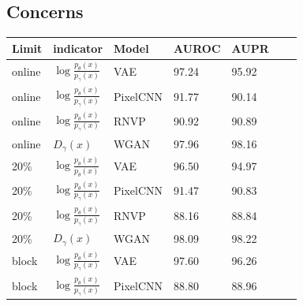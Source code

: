 \documentclass[letterpaper]{article} %
\begin{document}
\subsection{Concerns}
\begin{table}[htbp]
\centering
\begin{tabular}{lllllll}
Limit & indicator  & Model & AUROC & AUPR  \\
\toprule
online & $\log \frac{p_\theta(x)}{p_\gamma(x)}$ & VAE & 97.24 & 95.92 \\
online & $\log \frac{p_\theta(x)}{p_\gamma(x)}$ & PixelCNN & 91.77 & 90.14 \\
online & $\log \frac{p_\theta(x)}{p_\gamma(x)}$ & RNVP & 90.92 & 90.89 \\
online & $D_\gamma(x)$ & WGAN & 97.96 & 98.16 \\
20\% & $\log \frac{p_\theta(x)}{p_\theta(x)}$ & VAE & 96.50 & 94.97 \\
20\% & $\log \frac{p_\theta(x)}{p_\gamma(x)}$ & PixelCNN & 91.47 & 90.83 \\
20\% & $\log \frac{p_\theta(x)}{p_\gamma(x)}$ & RNVP & 88.16 & 88.84 \\
20\% & $D_\gamma(x)$ & WGAN & 98.09 & 98.22 \\
block & $\log \frac{p_\theta(x)}{p_\gamma(x)}$ & VAE & 97.60 & 96.26 \\
block & $\log \frac{p_\theta(x)}{p_\gamma(x)}$ & PixelCNN & 88.80 & 88.96 \\

\end{tabular}
\end{table}
\end{document}
